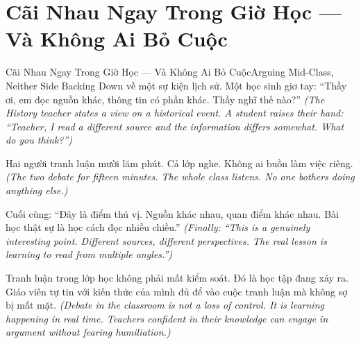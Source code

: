 \section{Cãi Nhau Ngay Trong Giờ Học --- Và Không Ai Bỏ Cuộc}
\begin{truyen}{Cãi Nhau Ngay Trong Giờ Học --- Và Không Ai Bỏ Cuộc}{Arguing Mid-Class, Neither Side Backing Down}
 về một sự kiện lịch sử. Một học sinh giơ tay: ``Thầy ơi, em đọc nguồn khác, thông tin có phần khác. Thầy nghĩ thế nào?''
\textit{(The History teacher states a view on a historical event. A student raises their hand: ``Teacher, I read a different source and the information differs somewhat. What do you think?'')}

Hai người tranh luận mười lăm phút. Cả lớp nghe. Không ai buồn làm việc riêng.
\textit{(The two debate for fifteen minutes. The whole class listens. No one bothers doing anything else.)}

Cuối cùng: ``Đây là điểm thú vị. Nguồn khác nhau, quan điểm khác nhau. Bài học thật sự là học cách đọc nhiều chiều.''
\textit{(Finally: ``This is a genuinely interesting point. Different sources, different perspectives. The real lesson is learning to read from multiple angles.'')}

\begin{baihoc}
Tranh luận trong lớp học không phải mất kiểm soát. Đó là học tập đang xảy ra. Giáo viên tự tin với kiến thức của mình đủ để vào cuộc tranh luận mà không sợ bị mất mặt.
\textit{(Debate in the classroom is not a loss of control. It is learning happening in real time. Teachers confident in their knowledge can engage in argument without fearing humiliation.)}
\end{baihoc}
\end{truyen}

